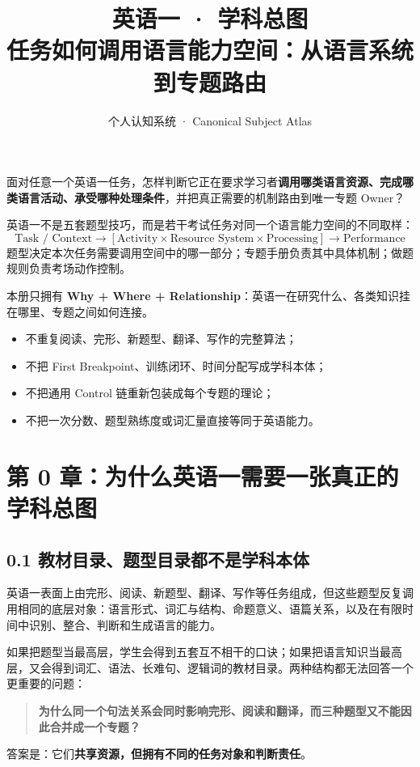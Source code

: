 \documentclass[11pt,a4paper]{ctexart}
\title{\vspace{-1.15cm}\textbf{英语一 · 学科总图}\\[0.35em]
\large 任务如何调用语言能力空间：从语言系统到专题路由}
\author{个人认知系统 · Canonical Subject Atlas}
\date{}
\newcommand{\kw}[1]{\textbf{#1}}
\begin{document}
\maketitle

\begin{corebox}[母问题]
面对任意一个英语一任务，怎样判断它正在要求学习者\kw{调用哪类语言资源、完成哪类语言活动、承受哪种处理条件}，并把真正需要的机制路由到唯一专题 Owner？
\end{corebox}

\begin{corebox}[一句话母模型]
英语一不是五套题型技巧，而是若干考试任务对同一个语言能力空间的不同取样：
\[
\boxed{
\text{Task / Context}
\longrightarrow
\left[
\text{Activity}
\times
\text{Resource System}
\times
\text{Processing}
\right]
\longrightarrow
\text{Performance}
}
\]
题型决定本次任务需要调用空间中的哪一部分；专题手册负责其中具体机制；做题规则负责考场动作控制。
\end{corebox}

\begin{warn}
本册只拥有 \kw{Why + Where + Relationship}：英语一在研究什么、各类知识挂在哪里、专题之间如何连接。
\begin{itemize}
  \item 不重复阅读、完形、新题型、翻译、写作的完整算法；
  \item 不把 First Breakpoint、训练闭环、时间分配写成学科本体；
  \item 不把通用 Control 链重新包装成每个专题的理论；
  \item 不把一次分数、题型熟练度或词汇量直接等同于英语能力。
\end{itemize}
\end{warn}

\tableofcontents
\newpage

\section{第 0 章：为什么英语一需要一张真正的学科总图}

\subsection{0.1 教材目录、题型目录都不是学科本体}
英语一表面上由完形、阅读、新题型、翻译、写作等任务组成，但这些题型反复调用相同的底层对象：语言形式、词汇与结构、命题意义、语篇关系，以及在有限时间中识别、整合、判断和生成语言的能力。

如果把题型当最高层，学生会得到五套互不相干的口诀；如果把语言知识当最高层，又会得到词汇、语法、长难句、逻辑词的教材目录。两种结构都无法回答一个更重要的问题：
\begin{quote}
\kw{为什么同一个句法关系会同时影响完形、阅读和翻译，而三种题型又不能因此合并成一个专题？}
\end{quote}
答案是：它们\kw{共享资源，但拥有不同的任务对象和判断责任}。
\end{document}

